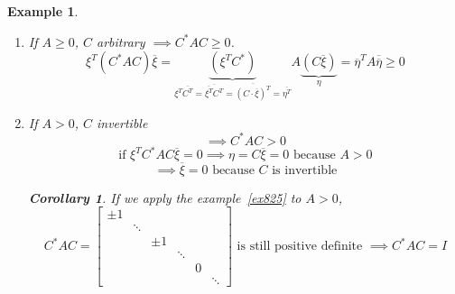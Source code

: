 \documentclass{article}
\newtheorem{example}{Example}  \numberwithin{example}{section}
\newtheorem*{corollary}{Corollary}%
\begin{document}
\begin{example} %
  \begin{enumerate}
    \item If $A \geq 0$, $C$ arbitrary $\implies C^* AC \geq 0$.
      \[ \xi^T (C^* AC) \overline{\xi} = \underbrace{(\xi^T C^*)}_{\xi^T \overline{C^T} = \overline{\overline{\xi^T} C^T} = \overline{(C \cdot \overline{\xi})^T} = \overline{\eta^T}} A \underbrace{(C \overline{\xi})}_{\eta}
         = \overline{\eta}^T A \overline{\overline{\eta}} \geq 0
      \]
    \item If $A > 0$, $C$ invertible
      \[ \implies C^* AC > 0 \]
      \[ \text{if } \xi^T C^* AC \overline{\xi} = 0 \implies  \eta = C \overline{\xi} = 0 \text{ because } A > 0 \]
      \[ \implies \overline{\xi} = 0 \text{ because } C \text{ is invertible} \]

      \begin{corollary}
        If we apply the example~\ref{ex825} to $A>0$,
        \[
          C^* AC = \begin{bmatrix}
            \pm 1 &        &       &        &   & \\
                  & \ddots &       &        &   & \\
                  &        & \pm 1 &        &   & \\
                  &        &       & \ddots &   & \\
                  &        &       &        & 0 & \\
                  &        &       &        &   & \ddots
          \end{bmatrix}
          \text{ is still positive definite }
          \implies C^* AC = I
        \]
      \end{corollary}
  \end{enumerate}
\end{example}
\end{document}
